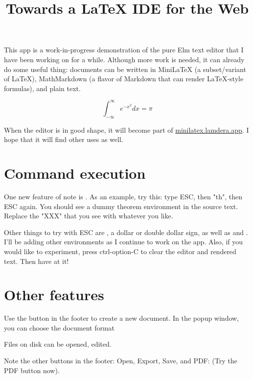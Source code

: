 

\title{Towards a LaTeX IDE for the Web}

\maketitle

\tableofcontents

This app is a work-in-progress demonstration of the
pure Elm text editor that I have been working on for
a while. Although more work is needed, it can
already do some useful thing: documents can be
written in MiniLaTeX (a subset/variant of LaTeX),
MathMarkdown (a flavor of Markdown that can render
LaTeX-style formulas), and plain text.

$$
\int_{-\infty}^\infty e^{-x^2} dx = \pi
$$

When the editor is in good shape, it will become
part of
\href{https://minilatex.lamdera.app}{minilatex.lamdera.app}.
I hope that it will find other uses as well.

\section{Command execution}

One new feature of note is .
As an example, try this: type ESC, then
"th", then ESC again. You should see a dummy theorem
environment in the source text. Replace the "XXX"
that you see with whatever you like.

Other things to try with ESC are , a dollar
or double dollar sign, as well as  and
. I'll be adding other environments as I
continue to work on the app. Also, if you would like
to experiment, press ctrl-option-C to clear the editor
and rendered text. Then have at it!


\section{Other features}

 Use the  button in the footer
to create a new document. In the popup window,
you can choose the document format


 Files on disk can be opened, edited.


 Note the other buttons in the footer:
Open, Export, Save, and PDF:  (Try the PDF button now).


